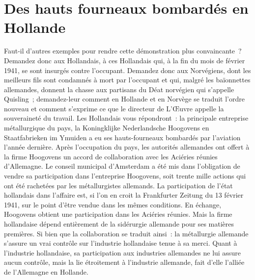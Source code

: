 \documentclass[french,twoside]{book} %
\begin{document}
\section[Des hauts fourneaux bombardés en Hollande]{Des hauts fourneaux bombardés en Hollande}
\noindent Faut-il d’autres exemples pour rendre cette démonstration plus convaincante ? Demandez donc aux Hollandais, à ces Hollandais qui, à la fin du mois de février 1941, se sont insurgés contre l’occupant. Demandez donc aux Norvégiens, dont les meilleurs fils sont condamnés à mort par l’occupant et qui, malgré les baïonnettes allemandes, donnent la chasse aux partisans du Déat norvégien qui s’appelle Quisling ; demandez-leur comment en Hollande et en Norvège se traduit l’ordre nouveau et comment s’exprime ce que le directeur de L’Œuvre appelle la souveraineté du travail. Les Hollandais vous répondront : la principale entreprise métallurgique du pays, la Koningklijke Nederlandsche Hoogovens en Staatfabrieken im Ymuiden a eu ses hauts-fourneaux bombardés par l’aviation l’année dernière. Après l’occupation du pays, les autorités allemandes ont offert à la firme Hoogovens un accord de collaboration avec les Aciéries réunies d’Allemagne. Le conseil municipal d’Amsterdam a été mis dans l’obligation de vendre sa participation dans l’entreprise Hoogovens, soit trente mille actions qui ont été rachetées par les métallurgistes allemands. La participation de l’état hollandais dans l’affaire est, si l’on en croit la Frankfurter Zeitung du 13 février 1941, sur le point d’être vendue dans les mêmes conditions. En échange, Hoogovens obtient une participation dans les Aciéries réunies. Mais la firme hollandaise dépend entièrement de la sidérurgie allemande pour ses matières premières. Si bien que la collaboration se traduit ainsi : la métallurgie allemande s’assure un vrai contrôle sur l’industrie hollandaise tenue à sa merci. Quant à l’industrie hollandaise, sa participation aux industries allemandes ne lui assure aucun contrôle, mais la lie étroitement à l’industrie allemande, fait d’elle l’alliée de l’Allemagne en Hollande.
\end{document}
